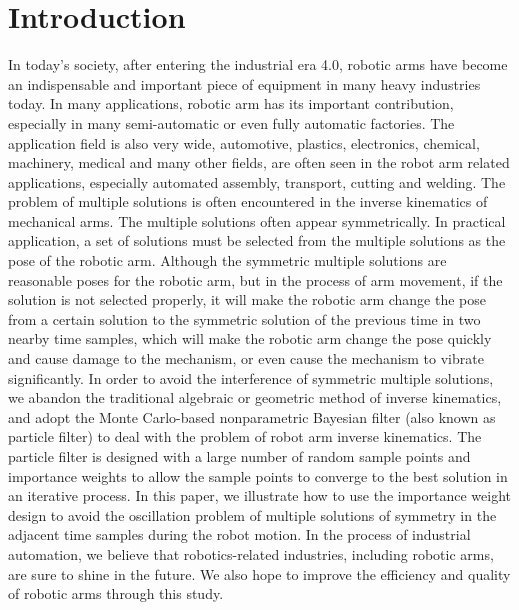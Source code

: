 \documentclass[journal,article,submit,pdftex,moreauthors]{Definitions/mdpi}
\begin{document}
\section{Introduction}

In today's society, after entering the industrial era 4.0, robotic arms have become an indispensable and important piece of equipment in many heavy industries today. In many applications, robotic arm has its important contribution, especially in many semi-automatic or even fully automatic factories. The application field is also very wide, automotive, plastics, electronics, chemical, machinery, medical and many other fields, are often seen in the robot arm related applications, especially automated assembly, transport, cutting and welding.
The problem of multiple solutions is often encountered in the inverse kinematics of mechanical arms. The multiple solutions often appear symmetrically. In practical application, a set of solutions must be selected from the multiple solutions as the pose of the robotic arm. Although the symmetric multiple solutions are reasonable poses for the robotic arm, but in the process of arm movement, if the solution is not selected properly, it will make the robotic arm change the pose from a certain solution to the symmetric solution of the previous time in two nearby time samples, which will make the robotic arm change the pose quickly and cause damage to the mechanism, or even cause the mechanism to vibrate significantly. In order to avoid the interference of symmetric multiple solutions, we abandon the traditional algebraic or geometric method of inverse kinematics, and adopt the Monte Carlo-based nonparametric Bayesian filter (also known as particle filter) to deal with the problem of robot arm inverse kinematics. The particle filter is designed with a large number of random sample points and importance weights to allow the sample points to converge to the best solution in an iterative process. In this paper, we illustrate how to use the importance weight design to avoid the oscillation problem of multiple solutions of symmetry in the adjacent time samples during the robot motion.
In the process of industrial automation, we believe that robotics-related industries, including robotic arms, are sure to shine in the future. We also hope to improve the efficiency and quality of robotic arms through this study.
\end{document}
